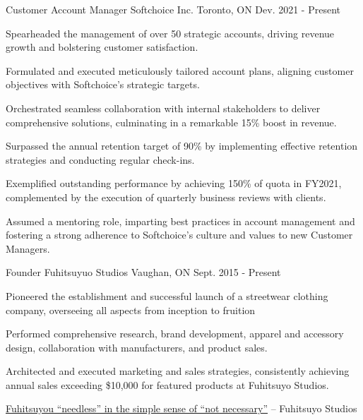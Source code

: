 

	
\begin{cventries}

\cventry
{Customer Account Manager} %
{Softchoice Inc.} %
{Toronto, ON} %
{Dev. 2021 - Present} %
{ %
\begin{cvitems}
\item {Spearheaded the management of over 50 strategic accounts, driving revenue growth and bolstering customer satisfaction.}
\item {Formulated and executed meticulously tailored account plans, aligning customer objectives with Softchoice's strategic targets.}
\item {Orchestrated seamless collaboration with internal stakeholders to deliver comprehensive solutions, culminating in a remarkable 15\% boost in revenue.}
\item {Surpassed the annual retention target of 90\% by implementing effective retention strategies and conducting regular check-ins.}
\item {Exemplified outstanding performance by achieving 150\% of quota in FY2021, complemented by the execution of quarterly business reviews with clients.}
\item {Assumed a mentoring role, imparting best practices in account management and fostering a strong adherence to Softchoice's culture and values to new Customer Managers.}
\end{cvitems}
}


\cventry
{Founder} %
{Fuhitsuyuo Studios} %
{Vaughan, ON} %
{Sept. 2015 - Present} %
{ %
\begin{cvitems}
\item {Pioneered the establishment and successful launch of a streetwear clothing company, overseeing all aspects from inception to fruition}
\item {Performed comprehensive research, brand development, apparel and accessory design, collaboration with manufacturers, and product sales.}
\item {Architected and executed marketing and sales strategies, consistently achieving annual sales exceeding \$10,000 for featured products at Fuhitsuyo Studios.}
\item {\href{https://fuhitsuyostudios.com}{Fuhitsuyou ``needless'' in the simple sense of ``not necessary''} – Fuhitsuyo Studios}
\end{cvitems}
}


\end{cventries}
